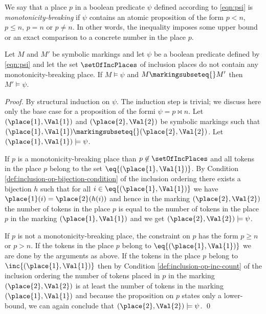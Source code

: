 We say that a place $p$ in a boolean predicate $\psi$
defined according to \cref{eqn:psi} is \emph{monotonicity-breaking}
if $\psi$ contains an atomic proposition of the form
$p < n$, $p \leq n$, $p = n$ or $p \not= n$. In other words, the 
inequality imposes some upper bound or an exact comparison to a
concrete number in the place $p$.

\begin{lemma}\label{lem:inc_empty_all_properties}
Let $M$ and $M'$ be symbolic markings and let $\psi$ be a boolean predicate 
defined by \cref{eqn:psi} and let
the set $\setOfIncPlaces$ of inclusion places do not contain any
monotonicity-breaking place. 
If $M \models \psi$ and $M \markingsubseteq{} M'$ then $M' \models \psi$.
\end{lemma}
\begin{proof}
By structural induction on $\psi$. The induction step
is trivial; we discuss here only the base case for a proposition of the formi
$\psi = p \bowtie n$.
Let $(\place{1},\Val{1})$ and $(\place{2},\Val{2})$ be symbolic markings 
such that $(\place{1},\Val{1}) \markingsubseteq{} (\place{2},\Val{2})$.
Let $(\place{1},\Val{1}) \models \psi$. 

If $p$ is a monotonicity-breaking place than $p \not\in \setOfIncPlaces$
and all tokens in the place $p$ belong to the set $\eq{(\place{1},\Val{1})}$.
By Condition \ref{def:inclusion-op-bijection-condition} of the inclusion
ordering
there exists a bijection $h$ such that 
for all $i \in \eq{(\place{1},\Val{1})}$ 
we have $\place{1}(i) = \place{2}(h(i))$ and hence
in the marking $(\place{2},\Val{2})$
the number of tokens in the place $p$ is equal to the number
of tokens in the place $p$ in the marking $(\place{1},\Val{1})$ and
we get $(\place{2},\Val{2})  \models \psi$.

If $p$ is not a monotonicity-breaking place, the constraint on $p$
has the form $p \geq n$ or $p > n$.
If the tokens in the place $p$ belong to $\eq{(\place{1},\Val{1})}$
we are done by the arguments as above.
If the tokens in the place $p$ belong to $\inc{(\place{1},\Val{1})}$
then by Condition \ref{def:inclusion-op-inc-count}
of the inclusion ordering 
the number of tokens placed in $p$ in the marking
$(\place{2},\Val{2})$ is at least the number of tokens in the marking 
$(\place{1},\Val{1})$ and because the proposition on $p$ states only
a lower-bound, we can again conclude that $(\place{2},\Val{2})  \models \psi$.
\qed
\end{proof}




